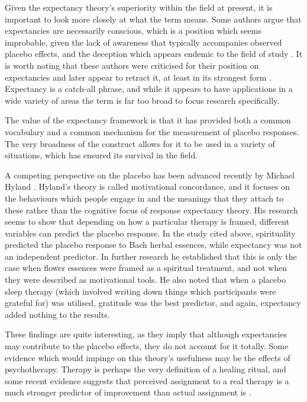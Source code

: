 Given the expectancy theory's superiority within the field at present, it is important to look more closely at what the term means. Some authors \cite{Stewart-Williams2004a}  argue that expectancies are necessarily conscious, which is a position which seems improbable, given the lack of awareness that typically accompanies observed placebo effects, and the deception which appears endemic to the field of study \cite{Miller2008a,Miller2008}.  It is worth noting that these authors were criticised for their position on expectancies \cite{Kirsch2004}  and later appear to retract it, at least in its strongest form \cite{Stewart-Williams2004}. Expectancy is a catch-all phrase, and while it appears to have applications in a wide variety of areas \cite{Montgomery2007} the term is far too broad to focus research specifically. 

The value of the expectancy framework is that it has provided both a common vocabulary and a common mechanism for the measurement of placebo responses. The very broadness of the construct allows for it to be used in a variety of situations, which has ensured its survival in the field. 

A competing perspective on the placebo has been advanced recently by Michael Hyland \cite{Hyland2006}. Hyland's theory is called motivational concordance, and it focuses on the behaviours which people engage in and the meanings that they attach to these rather than the cognitive focus of response expectancy theory.  His research seems to show that depending on how a particular therapy is framed, different variables can predict the placebo response.  In the study cited above, spirituality predicted the placebo response to Bach herbal essences, while expectancy was not an independent predictor. In further research \cite{Hyland2007} he established that this is only the case when flower essences were framed as a spiritual treatment, and not when they were described as motivational tools. He also noted that when a placebo sleep therapy (which involved writing down things which participants were grateful for) was utilised, gratitude was the best predictor, and again, expectancy added nothing to the results. 

These findings are quite interesting, as they imply that although expectancies may contribute to the placebo effects, they do not account for it totally. Some evidence which would impinge on this theory's usefulness may be the effects of psychotherapy. Therapy is perhaps the very definition of a healing ritual, and some recent evidence suggests that perceived assignment to a real therapy is a much stronger predictor of improvement than actual assignment is \cite{Bausell2005,Linde2007}.

